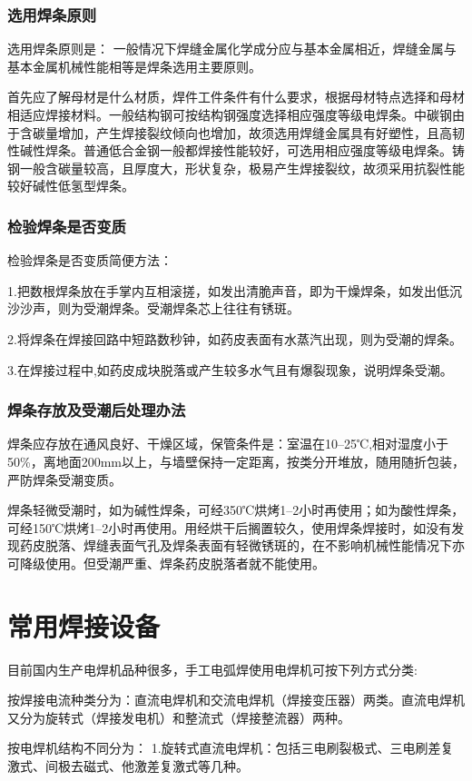 \documentclass{ctexbook}
\begin{document}
\subsubsection{选用焊条原则}
选用焊条原则是：
一般情况下焊缝金属化学成分应与基本金属相近，焊缝金属与基本金属机械性能相等是焊条选用主要原则。

首先应了解母材是什么材质，焊件工件条件有什么要求，根据母材特点选择和母材相适应焊接材料。一般结构钢可按结构钢强度选择相应强度等级电焊条。中碳钢由于含碳量增加，产生焊接裂纹倾向也增加，故须选用焊缝金属具有好塑性，且高韧性碱性焊条。普通低合金钢一般都焊接性能较好，可选用相应强度等级电焊条。铸钢一般含碳量较高，且厚度大，形状复杂，极易产生焊接裂纹，故须采用抗裂性能较好碱性低氢型焊条。
\subsubsection{检验焊条是否变质}
检验焊条是否变质简便方法：

1.把数根焊条放在手掌内互相滚搓，如发出清脆声音，即为干燥焊条，如发出低沉沙沙声，则为受潮焊条。受潮焊条芯上往往有锈斑。

2.将焊条在焊接回路中短路数秒钟，如药皮表面有水蒸汽出现，则为受潮的焊条。

3.在焊接过程中,如药皮成块脱落或产生较多水气且有爆裂现象，说明焊条受潮。
\subsubsection{焊条存放及受潮后处理办法}
焊条应存放在通风良好、干燥区域，保管条件是：室温在10--25℃,相对湿度小于50\%，离地面200mm以上，与墙壁保持一定距离，按类分开堆放，随用随折包装，严防焊条受潮变质。

焊条轻微受潮时，如为碱性焊条，可经350℃烘烤1--2小时再使用；如为酸性焊条，可经150℃烘烤1--2小时再使用。用经烘干后搁置较久，使用焊条焊接时，如没有发现药皮脱落、焊缝表面气孔及焊条表面有轻微锈斑的，在不影响机械性能情况下亦可降级使用。但受潮严重、焊条药皮脱落者就不能使用。
\section{常用焊接设备}
目前国内生产电焊机品种很多，手工电弧焊使用电焊机可按下列方式分类:

按焊接电流种类分为：直流电焊机和交流电焊机（焊接变压器）两类。直流电焊机又分为旋转式（焊接发电机）和整流式（焊接整流器）两种。

按电焊机结构不同分为：
1.旋转式直流电焊机：包括三电刷裂极式、三电刷差复激式、间极去磁式、他激差复激式等几种。
\end{document}
